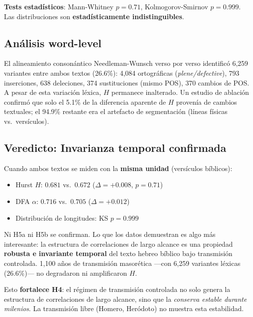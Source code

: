 \documentclass[12pt,a4paper]{article}
\begin{document}
\noindent
\textbf{Tests estad\'isticos}: Mann-Whitney $p = 0.71$,
Kolmogorov-Smirnov $p = 0.999$.
Las distribuciones son \textbf{estad\'isticamente indistinguibles}.

\subsection{An\'alisis word-level}

El alineamiento consonántico Needleman-Wunsch verso por verso identific\'o
6,259 variantes entre ambos textos (26.6\%):
4,084 ortogr\'aficas (\emph{plene/defective}), 793 inserciones, 638 deleciones,
374 sustituciones (mismo POS), 370 cambios de POS.
A pesar de esta variaci\'on l\'exica, $H$ permanece inalterado.
Un estudio de ablaci\'on confirm\'o que solo el 5.1\% de la diferencia
aparente de $H$ proven\'ia de cambios textuales; el 94.9\% restante era el
artefacto de segmentaci\'on (l\'ineas f\'isicas vs.\ vers\'iculos).

\subsection{Veredicto: Invarianza temporal confirmada}

Cuando ambos textos se miden con la \textbf{misma unidad} (vers\'iculos b\'iblicos):

\begin{itemize}[leftmargin=2em]
\item Hurst $H$: $0.681$ vs.\ $0.672$ ($\Delta = +0.008$, $p = 0.71$)
\item DFA $\alpha$: $0.716$ vs.\ $0.705$ ($\Delta = +0.012$)
\item Distribuci\'on de longitudes: KS $p = 0.999$
\end{itemize}

\noindent
Ni H5a ni H5b se confirman. Lo que los datos demuestran es algo
m\'as interesante: la estructura de correlaciones de largo alcance
es una propiedad \textbf{robusta e invariante temporal} del texto
hebreo b\'iblico bajo transmisi\'on controlada. 1,100 a\~nos de
transmisi\'on masor\'etica ---con 6,259 variantes l\'exicas (26.6\%)---
no degradaron ni amplificaron $H$.

Esto \textbf{fortalece H4}: el r\'egimen de transmisi\'on controlada
no solo genera la estructura de correlaciones de largo alcance,
sino que la \emph{conserva estable durante milenios}. La transmisi\'on
libre (Homero, Her\'odoto) no muestra esta estabilidad.


\end{document}
